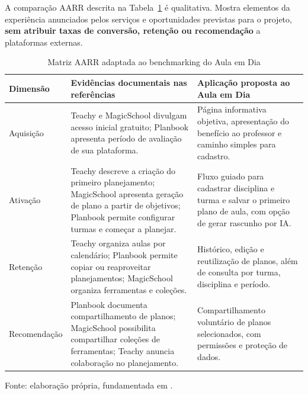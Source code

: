 \documentclass[12pt,a4paper,oneside]{report}
\begin{document}
A comparação AARR descrita na Tabela~\ref{tab:matriz-aarr} é qualitativa. Mostra elementos da experiência anunciados pelos serviços e oportunidades previstas para o projeto, \textbf{sem atribuir taxas de conversão, retenção ou recomendação} a plataformas externas.

\begin{table}[htbp]
\centering
\caption{Matriz AARR adaptada ao benchmarking do Aula em Dia}
\label{tab:matriz-aarr}
\scriptsize
\renewcommand{\arraystretch}{1.3}
\begin{tabularx}{\textwidth}{@{}>{\RaggedRight\arraybackslash}p{2cm}*{2}{>{\RaggedRight\arraybackslash}X}@{}}
\toprule
\textbf{Dimensão} & \textbf{Evidências documentais nas referências} & \textbf{Aplicação proposta ao Aula em Dia} \\
\midrule
Aquisição & Teachy e MagicSchool divulgam acesso inicial gratuito; Planbook apresenta período de avaliação de sua plataforma. & Página informativa objetiva, apresentação do benefício ao professor e caminho simples para cadastro. \\
Ativação & Teachy descreve a criação do primeiro planejamento; MagicSchool apresenta geração de plano a partir de objetivos; Planbook permite configurar turmas e começar a planejar. & Fluxo guiado para cadastrar disciplina e turma e salvar o primeiro plano de aula, com opção de gerar rascunho por IA. \\
Retenção & Teachy organiza aulas por calendário; Planbook permite copiar ou reaproveitar planejamentos; MagicSchool organiza ferramentas e coleções. & Histórico, edição e reutilização de planos, além de consulta por turma, disciplina e período. \\
Recomendação & Planbook documenta compartilhamento de planos; MagicSchool possibilita compartilhar coleções de ferramentas; Teachy anuncia colaboração no planejamento. & Compartilhamento voluntário de planos selecionados, com permissões e proteção de dados. \\
\bottomrule
\end{tabularx}
\par\smallskip
\begin{minipage}{\textwidth}\footnotesize Fonte: elaboração própria, fundamentada em \citet{teachy_planejamento2026,teachy_ferramentas2026,magicschool_ferramentas2026,magicschool_planos2026,planbook_professores2026}.\end{minipage}
\end{table}
\end{document}
